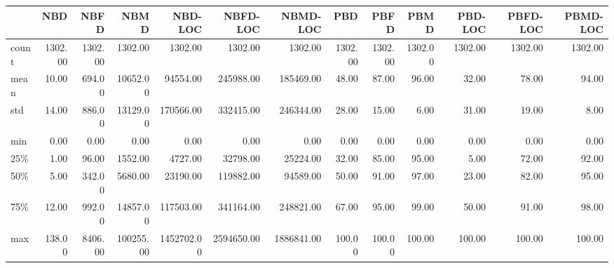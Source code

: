 \begin{tabular}{lrrrrrrrrrrrr}
\toprule
{} &     NBD &    NBFD &      NBMD &    NBD-LOC &   NBFD-LOC &   NBMD-LOC &     PBD &    PBFD &    PBMD &  PBD-LOC &  PBFD-LOC &  PBMD-LOC \\
\midrule
count & 1302.00 & 1302.00 &   1302.00 &    1302.00 &    1302.00 &    1302.00 & 1302.00 & 1302.00 & 1302.00 &  1302.00 &   1302.00 &   1302.00 \\
mean  &   10.00 &  694.00 &  10652.00 &   94554.00 &  245988.00 &  185469.00 &   48.00 &   87.00 &   96.00 &    32.00 &     78.00 &     94.00 \\
std   &   14.00 &  886.00 &  13129.00 &  170566.00 &  332415.00 &  246344.00 &   28.00 &   15.00 &    6.00 &    31.00 &     19.00 &      8.00 \\
min   &    0.00 &    0.00 &      0.00 &       0.00 &       0.00 &       0.00 &    0.00 &    0.00 &    0.00 &     0.00 &      0.00 &      0.00 \\
25\%   &    1.00 &   96.00 &   1552.00 &    4727.00 &   32798.00 &   25224.00 &   32.00 &   85.00 &   95.00 &     5.00 &     72.00 &     92.00 \\
50\%   &    5.00 &  342.00 &   5680.00 &   23190.00 &  119882.00 &   94589.00 &   50.00 &   91.00 &   97.00 &    23.00 &     82.00 &     95.00 \\
75\%   &   12.00 &  992.00 &  14857.00 &  117503.00 &  341164.00 &  248821.00 &   67.00 &   95.00 &   99.00 &    50.00 &     91.00 &     98.00 \\
max   &  138.00 & 8406.00 & 100255.00 & 1452702.00 & 2594650.00 & 1886841.00 &  100.00 &  100.00 &  100.00 &   100.00 &    100.00 &    100.00 \\
\bottomrule
\end{tabular}
